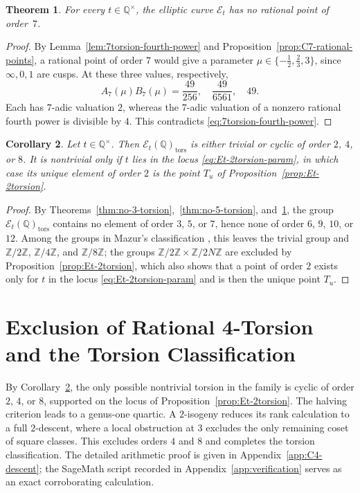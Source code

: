\documentclass[11pt,a4paper]{amsart}
\newtheorem{theorem}{Theorem}[section]
\newtheorem{corollary}[theorem]{Corollary}
\theoremstyle{definition}
\theoremstyle{remark}
\numberwithin{equation}{section}
\newcommand{\Q}{\mathbb{Q}}
\newcommand{\Z}{\mathbb{Z}}
\newcommand{\mathcalE}{\mathcal{E}}
\begin{document}
\begin{theorem}\label{thm:no-7-torsion}
For every $t\in\Q^\times$, the elliptic curve $\mathcalE_t$ has no rational point of order~$7$.
\end{theorem}

\begin{proof}
By Lemma~\ref{lem:7torsion-fourth-power} and
Proposition~\ref{prop:C7-rational-points}, a rational point of order $7$
would give a parameter $\mu\in\{-\tfrac12,\tfrac23,3\}$, since
$\infty,0,1$ are cusps. At these three values, respectively,
\[
A_7(\mu)B_7(\mu)=\frac{49}{256},\quad\frac{49}{6561},\quad49.
\]
Each has $7$-adic valuation $2$, whereas the $7$-adic valuation of a
nonzero rational fourth power is divisible by $4$. This contradicts
\eqref{eq:7torsion-fourth-power}.
\end{proof}

\begin{corollary}\label{cor:remaining-torsion}
Let \(t\in\Q^\times\). Then \(\mathcalE_t(\Q)_{\mathrm{tors}}\) is either trivial or cyclic of order \(2\), \(4\), or \(8\). It is nontrivial only if \(t\) lies in the locus \eqref{eq:Et-2torsion-param}, in which case its unique element of order \(2\) is the point \(T_u\) of Proposition~\ref{prop:Et-2torsion}.
\end{corollary}

\begin{proof}
By Theorems~\ref{thm:no-3-torsion},~\ref{thm:no-5-torsion}, and~\ref{thm:no-7-torsion}, the group \(\mathcalE_t(\Q)_{\mathrm{tors}}\) contains no element of order \(3\), \(5\), or \(7\), hence none of order \(6\), \(9\), \(10\), or \(12\). Among the groups in Mazur's classification \cite{mazur1977modular,mazur1978rational}, this leaves the trivial group and \(\Z/2\Z\), \(\Z/4\Z\), and \(\Z/8\Z\); the groups \(\Z/2\Z\times\Z/2N\Z\) are excluded by Proposition~\ref{prop:Et-2torsion}, which also shows that a point of order \(2\) exists only for \(t\) in the locus \eqref{eq:Et-2torsion-param} and is then the unique point \(T_u\).\hspace*{1em}
\end{proof}

\section{Exclusion of Rational 4-Torsion and the Torsion Classification}\label{sec:torsion-2primary}

By Corollary~\ref{cor:remaining-torsion}, the only possible nontrivial torsion in the family is cyclic of order $2$, $4$, or $8$, supported on the locus of Proposition~\ref{prop:Et-2torsion}. The halving criterion leads to a genus-one quartic. A $2$-isogeny reduces its rank calculation to a full $2$-descent, where a local obstruction at $3$ excludes the only remaining coset of square classes. This excludes orders $4$ and $8$ and completes the torsion classification. The detailed arithmetic proof is given in Appendix~\ref{app:C4-descent}; the SageMath script recorded in Appendix~\ref{app:verification} serves as an exact corroborating calculation.
\end{document}
